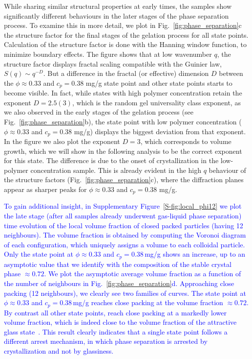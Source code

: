 \documentclass[preprint,amsmath,amssymb,superscriptaddress]{revtex4-1}
\begin{document}
While sharing similar structural properties at early times, the samples show significantly different behaviours in the later stages of the phase separation process.
To examine this in more detail, we plot in Fig.~\ref{fig:phase_separation}c the structure factor for the final stages of the gelation process for all state points.
Calculation of the structure factor is done with the Hanning window function, to minimize boundary effects.
The figure shows that at low wavenumber $q$, the structure factor displays fractal scaling compatible with the Guinier law, $S(q)\sim q^{-D}$.
But a difference in the fractal (or effective) dimension $D$ between the $\phi\approx 0.33$ and $c_p=0.38$ mg/g state point and other state points starts to become visible. In fact, while states
with high polymer concentration retain the exponent $D=2.5(3)$, 
which is the random gel universality class exponent, as we also observed in the early stages of the gelation process (see Fig.~\ref{fig:phase_separation}b),
the state point with low polymer concentration ($\phi\approx 0.33$ and $c_p=0.38$ mg/g) displays the biggest deviation from that exponent. In the figure we also
plot the exponent $D=3$, which corresponds to volume growth, which we will show in the following analysis to be the correct exponent for this state. 
The difference is due to the onset of crystallization in the low-polymer concentration sample. This is already evident in the high $q$ behaviour of
the structure factors (Fig.~\ref{fig:phase_separation}c), where the diffraction planes appear as sharper peaks for $\phi\approx 0.33$ and $c_p=0.38$ mg/g.

\textcolor{blue}{To gain additional insight, in Supplementary Figure~\ref{S-fig:local_phi12} we plot the late stage (after all samples already underwent gas-liquid phase separation) time evolution of the local volume fraction of closed packed particles (having 12 neighbours). The volume fraction is obtained by computing the Voronoi diagram of each configuration, which uniquely assigns a volume to each colloidal particle. Only the state point at $\phi\approx 0.33$ and $c_p = 0.38\,$mg/g shows an increase, up to an asymptotic value that we identify with the composition of the stable crystal phase $\approx 0.72$. We plot the asymptotic average volume fraction as a function of the number of neighbours in Fig.~\ref{fig:phase_separation}d. Approaching close packing (12 neighbours), we clearly see two families of curves. The state point at $\phi\approx 0.33$ and $c_p=0.38\,$mg/g reaches close packing at the volume fraction $\approx 0.72$. By contrast all other state points, reach close packing at a markedly 
lower volume fraction, which is indeed close to the volume fraction of the attractive glass state~\cite{pham2002multiple}. This result clearly indicates that a single state point follows a different arrest mechanism, in which phase separation is arrested by crystallization and not by glassiness.}
\end{document}
